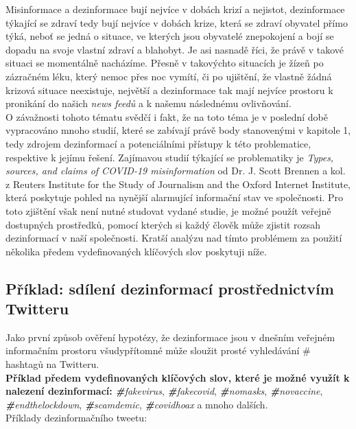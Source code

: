 Misinformace a dezinformace bují nejvíce v dobách krizí a nejistot, dezinformace týkající se zdraví tedy bují nejvíce v dobách krize, která se zdraví obyvatel přímo týká, neboť se jedná o situace, ve kterých jsou obyvatelé znepokojení a bojí se dopadu na svoje vlastní zdraví a blahobyt. Je asi nasnadě říci, že právě v takové situaci se momentálně nacházíme. Přesně v takovýchto situacích je žízeň po zázračném léku, který nemoc přes noc vymítí, či po ujištění, že vlastně žádná krizová situace neexistuje, největší a dezinformace tak mají nejvíce prostoru k pronikání do našich \textit{news feedů} a k našemu následnému ovlivňování.\\

O závažnosti tohoto tématu svědčí i fakt, že na toto téma je v poslední době vypracováno mnoho studií, které se zabívají právě body stanovenými v kapitole 1, tedy zdrojem dezinformací a potenciálními přístupy k této problematice, respektive k jejímu řešení. Zajímavou studií týkající se problematiky je \textit{Types, sources, and claims of COVID-19 misinformation} od Dr. J. Scott Brennen a kol. z Reuters Institute for the Study of Journalism and the Oxford Internet Institute\cite{noauthor_types_nodate}, která poskytuje pohled na nynější alarmující informační stav ve společnosti. Pro toto zjištění však není nutné studovat vydané studie, je možné použít veřejně dostupných prostředků, pomocí kterých si každý člověk může zjistit rozsah dezinformací v naší společnosti. Kratší analýzu nad tímto problémem za použití několika předem vydefinovaných klíčových slov poskytuji níže.

\subsection{Příklad: sdílení dezinformací prostřednictvím Twitteru}

Jako první způsob ověření hypotézy, že dezinformace jsou v dnešním veřejném informačním prostoru všudypřítomné může sloužit prosté vyhledávání \# hashtagů na Twitteru.\\

\textbf{Příklad předem vydefinovaných klíčových slov, které je možné využít k nalezení dezinformací:} \textit{\textbf{\#}fakevirus}, \textit{\textbf{\#}fakecovid}, \textit{\textbf{\#}nomasks}, \textit{\textbf{\#}novaccine}, \textit{\textbf{\#}endthelockdown}, \textit{\textbf{\#}scamdemic}, \textit{\textbf{\#}covidhoax} a mnoho dalších.\\

\vspace*{-3mm}
Příklady dezinformačního tweetu:\\
\vspace*{-3mm}

